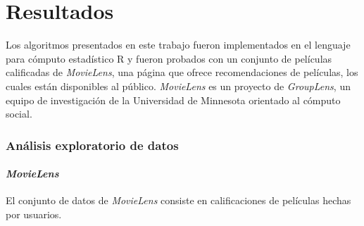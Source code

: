 \chapter{Resultados}

Los algoritmos presentados en este trabajo fueron implementados en el lenguaje 
para cómputo estadístico R y fueron probados con un conjunto de películas 
calificadas de \textit{MovieLens}, una página que ofrece recomendaciones de 
películas, los cuales están disponibles al público. \textit{MovieLens} es un 
proyecto de \textit{GroupLens}, un equipo de investigación de la Universidad de 
Minnesota orientado al cómputo social.

\subsection{Análisis exploratorio de datos}

\subsubsection{\textit{MovieLens}}

El conjunto de datos de \textit{MovieLens} consiste en  calificaciones de  películas 
hechas por  usuarios.


